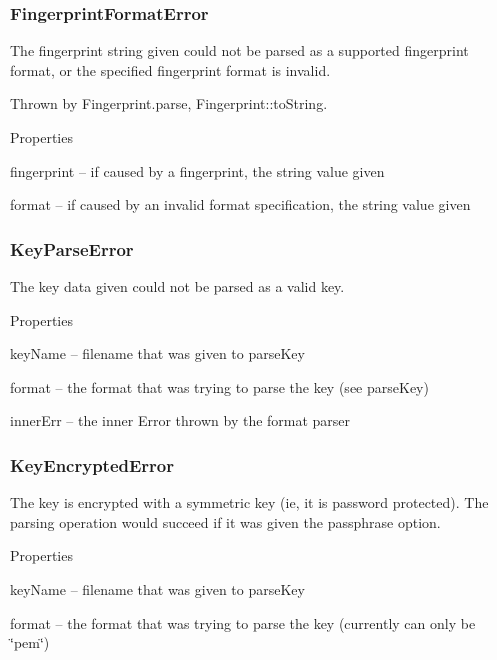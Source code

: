 \subsubsection*{{\ttfamily Fingerprint\+Format\+Error}}

The fingerprint string given could not be parsed as a supported fingerprint format, or the specified fingerprint format is invalid.

Thrown by {\ttfamily Fingerprint.\+parse}, {\ttfamily Fingerprint\+::to\+String}.

Properties


\begin{DoxyItemize}
\item {\ttfamily fingerprint} -- if caused by a fingerprint, the string value given
\item {\ttfamily format} -- if caused by an invalid format specification, the string value given
\end{DoxyItemize}

\subsubsection*{{\ttfamily Key\+Parse\+Error}}

The key data given could not be parsed as a valid key.

Properties


\begin{DoxyItemize}
\item {\ttfamily key\+Name} -- {\ttfamily filename} that was given to {\ttfamily parse\+Key}
\item {\ttfamily format} -- the {\ttfamily format} that was trying to parse the key (see {\ttfamily parse\+Key})
\item {\ttfamily inner\+Err} -- the inner Error thrown by the format parser
\end{DoxyItemize}

\subsubsection*{{\ttfamily Key\+Encrypted\+Error}}

The key is encrypted with a symmetric key (ie, it is password protected). The parsing operation would succeed if it was given the {\ttfamily passphrase} option.

Properties


\begin{DoxyItemize}
\item {\ttfamily key\+Name} -- {\ttfamily filename} that was given to {\ttfamily parse\+Key}
\item {\ttfamily format} -- the {\ttfamily format} that was trying to parse the key (currently can only be {\ttfamily \char`\"{}pem\char`\"{}})
\end{DoxyItemize}

